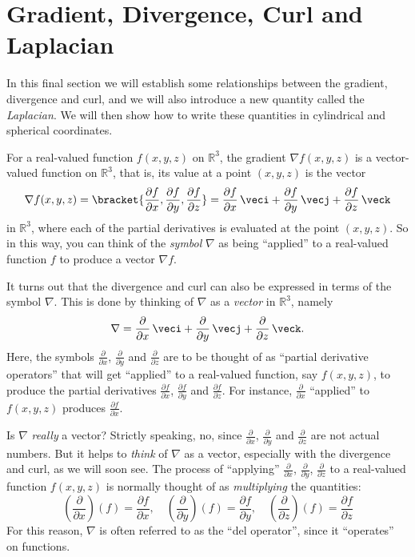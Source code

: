 \section{Gradient, Divergence, Curl and Laplacian}\label{divgradcurllap}

In this final section we will establish some relationships between the gradient, divergence and curl, and we will also introduce a new quantity called the \emph{Laplacian}. We will then show how to write these quantities in cylindrical and spherical coordinates.

For a real-valued function $f(x,y,z)$ on $\mathbb{R}^{3}$, the gradient $\nabla f(x,y,z)$ is a vector-valued function on $\mathbb{R}^{3}$, that is, its value at a point $(x,y,z)$ is the vector
\[
 \nabla f(x,y,z) = \bracket{\frac{\partial f}{\partial x},\frac{\partial f}{\partial y},\frac{\partial f}{\partial z}}
 =\frac{\partial f}{\partial x}\,\veci + \frac{\partial f}{\partial y}\,\vecj +
 \frac{\partial f}{\partial z}\,\veck
\]
in $\mathbb{R}^{3}$, where each of the partial derivatives is evaluated at the point $(x,y,z)$. So in this way, you can think of the \emph{symbol} $\nabla$ as being ``applied'' to a real-valued function $f$ to produce a vector $\nabla f$.

It turns out that the divergence and curl can also be expressed in terms of the symbol $\nabla$. This is done by thinking of $\nabla$ as a \emph{vector} in $\mathbb{R}^{3}$, namely\index{$\nabla$}
\begin{equation}\label{nabladef}
 \nabla = \frac{\partial}{\partial x}\,\veci + \frac{\partial}{\partial y}\,\vecj +
   \frac{\partial}{\partial z}\,\veck .
\end{equation}
Here, the symbols $\frac{\partial}{\partial x}$, $ \frac{\partial}{\partial y}$ and $\frac{\partial}{\partial z}$ are to be thought of as ``partial derivative operators'' that will get ``applied'' to a real-valued function, say $f(x,y,z)$, to produce the partial derivatives $\frac{\partial f}{\partial x}$, $\frac{\partial f}{\partial y}$ and $\frac{\partial f}{\partial z}$. For instance, $\frac{\partial}{\partial x}$ ``applied'' to $f(x,y,z)$ produces $\frac{\partial f}{\partial x}$.

Is $\nabla$ \emph{really} a vector? Strictly speaking, no, since $\frac{\partial}{\partial x}$, $\frac{\partial}{\partial y}$ and $\frac{\partial}{\partial z}$ are not actual numbers. But it helps to \emph{think} of $\nabla$ as a vector, especially with the divergence and curl, as we will soon see. The process of ``applying'' $\frac{\partial}{\partial x}$, $\frac{\partial}{\partial y}$, $\frac{\partial}{\partial z}$ to a real-valued function $f(x,y,z)$ is normally thought of as \emph{multiplying} the quantities:
\[
 \left( \frac{\partial}{\partial x} \right) (f) = \frac{\partial f}{\partial x} ,\quad
 \left( \frac{\partial}{\partial y} \right) (f) = \frac{\partial f}{\partial y} ,\quad
 \left( \frac{\partial}{\partial z} \right) (f) = \frac{\partial f}{\partial z}
\]
For this reason, $\nabla$ is often referred to as the ``del operator'', since it ``operates'' on functions.
 
